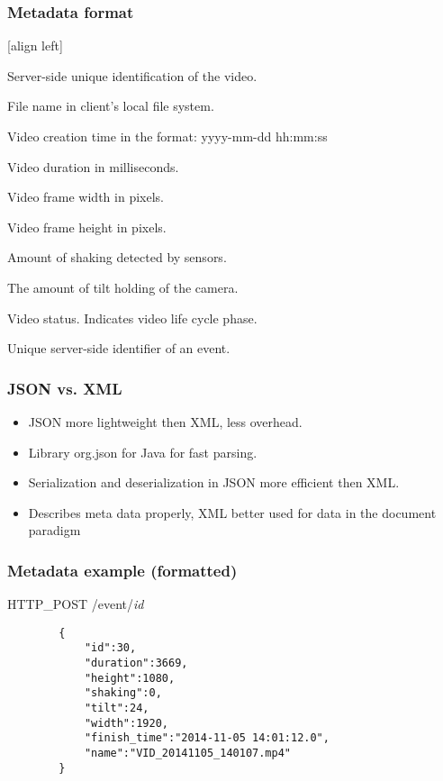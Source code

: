 \begin{frame}
	\frametitle{Metadata format}
	[align left]
	\begin{description}
		\item[id] 
			Server-side unique identification of the video.
		\item[name]
			File name in client's local file system.			
		\item[finish\_time]
			Video creation time in the format: yyyy-mm-dd hh:mm:ss
		\item[duration]
			Video duration in milliseconds.	
		\item[width]
			Video frame width in pixels.
		\item[height]
			Video frame height in pixels.		
		\item[shaking]
			Amount of shaking detected by sensors.
		\item[tilt]
			The amount of tilt holding of the camera.
		\item[status]
			Video status. Indicates video life cycle phase.
		\item[event\_id]
			Unique server-side identifier of an event.		
	\end{description}
\end{frame}

\begin{frame}[fragile]
	\frametitle{JSON vs. XML}
		\begin{itemize}
			\item JSON more lightweight then  XML, less overhead.
			\item Library org.json for Java for fast parsing.
			\item Serialization and deserialization in JSON more efficient then XML.
			\item Describes meta data properly, XML better used for data in the document paradigm
		\end{itemize}
\end{frame}

\begin{frame}[fragile]
	\frametitle{Metadata example (formatted) }
		HTTP\_POST /event/\textit{id}\footnotemark
		\begin{verbatim}
		{
		    "id":30,
		    "duration":3669,
		    "height":1080,
		    "shaking":0,
		    "tilt":24,
		    "width":1920,
		    "finish_time":"2014-11-05 14:01:12.0",
		    "name":"VID_20141105_140107.mp4"
		}
		\end{verbatim}
\end{frame}
